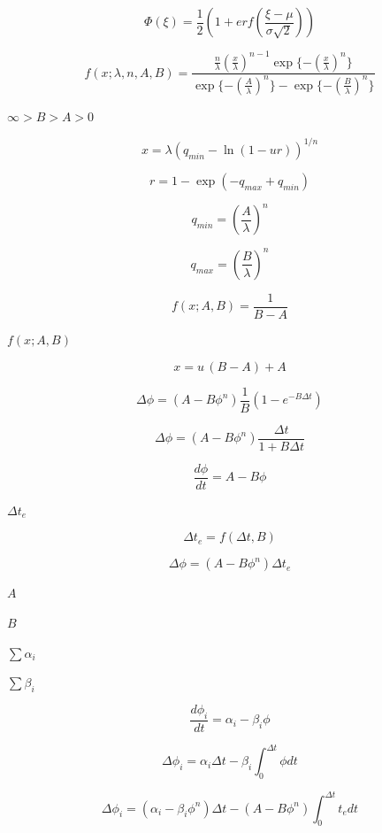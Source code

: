\documentclass{article}
\begin{document}
\[
        \Phi(\xi) =
            \frac{1}{2}
            \left(
                1 + {erf}\left(\frac{\xi - \mu}{\sigma \sqrt{2} }\right)
            \right)
    \]
\pagebreak

\[
    f(x; \lambda, n, A, B) =
        \frac{
            \frac{n}{\lambda}
            \left( \frac{x}{\lambda} \right)^{n-1}
            \exp\{ -(\frac{x}{\lambda})^n \}
        }{
            \exp\{- (\frac{A}{\lambda})^n \}
          - \exp\{- (\frac{B}{\lambda})^n \}
        }
\]
\pagebreak

$ \infty > B > A > 0$
\pagebreak

\[
        x = \lambda \left( q_{min} - \ln (1 - u r) \right)^{1/n}
    \]
\pagebreak

\[
        r = 1 - \exp(-q_{max} + q_{min})
    \]
\pagebreak

\[
        q_{min} = \left(\frac{A}{\lambda}\right)^n
    \]
\pagebreak

\[
        q_{max} = \left(\frac{B}{\lambda}\right)^n
    \]
\pagebreak

\[
    f(x; A, B) = \frac{1}{B - A}
\]
\pagebreak

$      f(x; A, B)  $
\pagebreak

\[
        x = u \, (B - A) + A
    \]
\pagebreak

\[
    \Delta \phi = (A - B \phi^n) \frac{1}{B} (1 - e^{- B \Delta t})
\]
\pagebreak

\[
    \Delta \phi = (A - B \phi^n) \frac{\Delta t}{1 + B \Delta t}
\]
\pagebreak

\[
        \frac{d \phi}{d t} = A - B \phi
    \]
\pagebreak

$\Delta
t_e$
\pagebreak

\[
        \Delta t_e = f(\Delta t, B)
    \]
\pagebreak

\[
        \Delta \phi = (A - B \phi^n) \Delta t_e
    \]
\pagebreak

$A$
\pagebreak

$B$
\pagebreak

$\sum \alpha_i$
\pagebreak

$\sum \beta_i$
\pagebreak

\[
        \frac{d \phi_i}{d t} = \alpha_i - \beta_i \phi
    \]
\pagebreak

\[
        \Delta \phi_i = \alpha_i \Delta t -
        \beta_i \int_0^{\Delta t} \phi d t
    \]
\pagebreak

\[
        \Delta \phi_i = (\alpha_i - \beta_i \phi^n) \Delta t -
        (A - B \phi^n) \int_0^{\Delta t} t_e dt
    \]
\pagebreak
\end{document}
